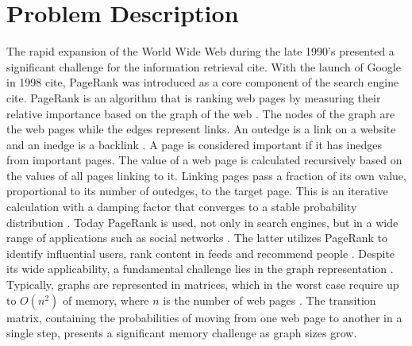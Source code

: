 \documentclass[a4paper,12pt]{article}
\begin{document}
\section{Problem Description}
The rapid expansion of the World Wide Web during the late 1990's presented a significant challenge for the information retrieval cite. With the launch of Google in 1998 cite, PageRank was introduced as a core component of the search engine cite. PageRank is an algorithm that is ranking web pages by measuring their relative importance based on the graph of the web \cite{page_pagerank_1999}. The nodes of the graph are the web pages while the edges represent links. An outedge is a link on a website and an inedge is a backlink \cite{page_pagerank_1999}. A page is considered important if it has inedges from important pages. The value of a web page is calculated recursively based on the values of all pages linking to it. Linking pages pass a fraction of its own value, proportional to its number of outedges, to the target page. This is an iterative calculation with a damping factor that converges to a stable probability distribution \cite{page_pagerank_1999}. 
Today PageRank is used, not only in search engines, but in a wide range of applications such as social networks \cite{wu_efficient_2024}. The latter utilizes PageRank to identify influential users, rank content in feeds and recommend people \cite{weng_twitterrank_2010}. Despite its wide applicability, a fundamental challenge lies in the graph representation \cite{liu_fast_2015}. Typically, graphs are represented in matrices, which in the worst case require up to $O(n^2)$ of memory, where $n$ is the number of web pages \cite{wu_efficient_2024}. The transition matrix, containing the probabilities of moving from one web page to another in a single step, presents a significant memory challenge as graph sizes grow. 

\end{document}
